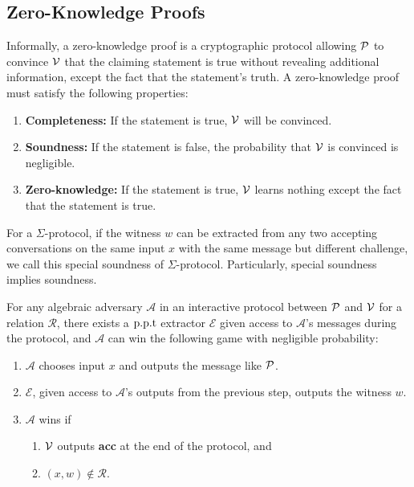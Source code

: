 \subsection{Zero-Knowledge Proofs}
Informally, a zero-knowledge proof is a cryptographic protocol allowing $\mathcal{P}$ to convince $\mathcal{V}$ that the claiming statement is true without revealing additional information, except the fact that the statement's truth. A zero-knowledge proof must satisfy the following properties:
\begin{enumerate}
    \item \textbf{Completeness:} If the statement is true, $\mathcal{V}$ will be convinced.
    \item \textbf{Soundness:} If the statement is false, the probability that $\mathcal{V}$ is convinced is negligible.
    \item \textbf{Zero-knowledge:} If the statement is true, $\mathcal{V}$ learns nothing except the fact that the statement is true.
\end{enumerate}

\begin{definition}
For a $\Sigma$-protocol, if the witness $w$ can be extracted from any two accepting conversations on the same input $x$ with the same message but different challenge, we call this special soundness of $\Sigma$-protocol. Particularly, special soundness implies soundness.
\end{definition}

\begin{definition}
For any algebraic adversary $\mathcal{A}$ in an interactive protocol between $\mathcal{P}$ and $\mathcal{V}$ for a relation $\mathcal{R}$, there exists a $\text{p.p.t}$ extractor $\mathcal{E}$ given access to $\mathcal{A}$'s messages during the protocol, and $\mathcal{A}$ can win the following game with negligible probability:
\begin{enumerate}
    \item $\mathcal{A}$ chooses input $x$ and outputs the message like $\mathcal{P}$.
    \item $\mathcal{E}$, given access to $\mathcal{A}$'s outputs from the previous step, outputs the witness $w$.
    \item $\mathcal{A}$ wins if
    \begin{enumerate}
        \item $\mathcal{V}$ outputs \textbf{acc} at the end of the protocol, and
        \item $(x,w)\notin\mathcal{R}$.
    \end{enumerate}
\end{enumerate}
\end{definition}

